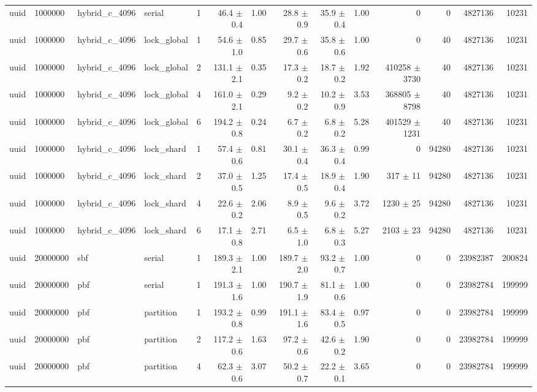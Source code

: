 \begin{tabular}{lllllrrrrrrrrr}
uuid & 1000000 & hybrid\_c\_4096 & serial & 1 & 46.4 $\pm$ 0.4 & 1.00 & 28.8 $\pm$ 0.9 & 35.9 $\pm$ 0.4 & 1.00 & 0 & 0 & 4827136 & 10231 \\
uuid & 1000000 & hybrid\_c\_4096 & lock\_global & 1 & 54.6 $\pm$ 1.0 & 0.85 & 29.7 $\pm$ 0.6 & 35.8 $\pm$ 0.6 & 1.00 & 0 & 40 & 4827136 & 10231 \\
uuid & 1000000 & hybrid\_c\_4096 & lock\_global & 2 & 131.1 $\pm$ 2.1 & 0.35 & 17.3 $\pm$ 0.2 & 18.7 $\pm$ 0.2 & 1.92 & 410258 $\pm$ 3730 & 40 & 4827136 & 10231 \\
uuid & 1000000 & hybrid\_c\_4096 & lock\_global & 4 & 161.0 $\pm$ 2.1 & 0.29 & 9.2 $\pm$ 0.2 & 10.2 $\pm$ 0.9 & 3.53 & 368805 $\pm$ 8798 & 40 & 4827136 & 10231 \\
uuid & 1000000 & hybrid\_c\_4096 & lock\_global & 6 & 194.2 $\pm$ 0.8 & 0.24 & 6.7 $\pm$ 0.2 & 6.8 $\pm$ 0.2 & 5.28 & 401529 $\pm$ 1231 & 40 & 4827136 & 10231 \\
uuid & 1000000 & hybrid\_c\_4096 & lock\_shard & 1 & 57.4 $\pm$ 0.6 & 0.81 & 30.1 $\pm$ 0.4 & 36.3 $\pm$ 0.4 & 0.99 & 0 & 94280 & 4827136 & 10231 \\
uuid & 1000000 & hybrid\_c\_4096 & lock\_shard & 2 & 37.0 $\pm$ 0.5 & 1.25 & 17.4 $\pm$ 0.5 & 18.9 $\pm$ 0.4 & 1.90 & 317 $\pm$ 11 & 94280 & 4827136 & 10231 \\
uuid & 1000000 & hybrid\_c\_4096 & lock\_shard & 4 & 22.6 $\pm$ 0.2 & 2.06 & 8.9 $\pm$ 0.5 & 9.6 $\pm$ 0.2 & 3.72 & 1230 $\pm$ 25 & 94280 & 4827136 & 10231 \\
uuid & 1000000 & hybrid\_c\_4096 & lock\_shard & 6 & 17.1 $\pm$ 0.8 & 2.71 & 6.5 $\pm$ 1.0 & 6.8 $\pm$ 0.3 & 5.27 & 2103 $\pm$ 23 & 94280 & 4827136 & 10231 \\
uuid & 20000000 & sbf & serial & 1 & 189.3 $\pm$ 2.1 & 1.00 & 189.7 $\pm$ 2.0 & 93.2 $\pm$ 0.7 & 1.00 & 0 & 0 & 23982387 & 200824 \\
uuid & 20000000 & pbf & serial & 1 & 191.3 $\pm$ 1.6 & 1.00 & 190.7 $\pm$ 1.9 & 81.1 $\pm$ 0.6 & 1.00 & 0 & 0 & 23982784 & 199999 \\
uuid & 20000000 & pbf & partition & 1 & 193.2 $\pm$ 0.8 & 0.99 & 191.1 $\pm$ 1.6 & 83.4 $\pm$ 0.5 & 0.97 & 0 & 0 & 23982784 & 199999 \\
uuid & 20000000 & pbf & partition & 2 & 117.2 $\pm$ 0.6 & 1.63 & 97.2 $\pm$ 0.6 & 42.6 $\pm$ 0.2 & 1.90 & 0 & 0 & 23982784 & 199999 \\
uuid & 20000000 & pbf & partition & 4 & 62.3 $\pm$ 0.6 & 3.07 & 50.2 $\pm$ 0.7 & 22.2 $\pm$ 0.1 & 3.65 & 0 & 0 & 23982784 & 199999 \\

\end{tabular}
